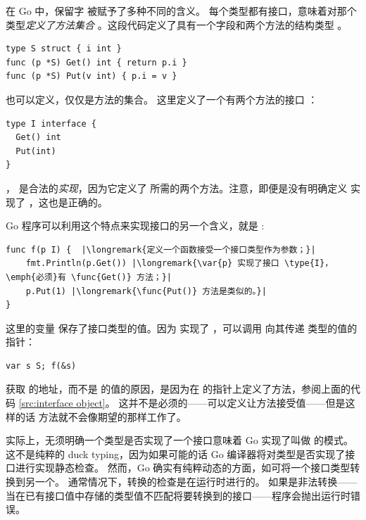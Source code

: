 \noindent{}
在 Go 中，保留字  被赋予了多种不同的含义。
每个类型都有接口，意味着对那个类型\emph{定义了方法集合}
。这段代码定义了具有一个字段和两个方法的结构类型 。
\begin{lstlisting}[caption=定义结构和结构的方法,label=src:interface object]
type S struct { i int }
func (p *S) Get() int { return p.i }
func (p *S) Put(v int) { p.i = v }
\end{lstlisting}
也可以定义，仅仅是方法的集合。
这里定义了一个有两个方法的接口 ：
\begin{lstlisting}
type I interface {
  Get() int
  Put(int)
}
\end{lstlisting}

 ， 是合法的\emph{实现}，因为它定义了 
所需的两个方法。注意，即便是没有明确定义  实现了 ，这也是正确的。

Go 程序可以利用这个特点来实现接口的另一个含义，就是
:

\begin{lstlisting}
func f(p I) {  |\longremark{定义一个函数接受一个接口类型作为参数；}|
    fmt.Println(p.Get()) |\longremark{\var{p} 实现了接口 \type{I}，\emph{必须}有 \func{Get()} 方法；}|
    p.Put(1) |\longremark{\func{Put()} 方法是类似的。}|
}
\end{lstlisting}
\showremarks
这里的变量  保存了接口类型的值。因为
 实现了 ，可以调用  向其传递  类型的值的指针：
\begin{lstlisting}
var s S; f(&s)
\end{lstlisting}

获取  的地址，而不是  的值的原因，是因为在  
的指针上定义了方法，参阅上面的代码 \ref{src:interface object}。
这并不是必须的——可以定义让方法接受值——但是这样的话  方法就不会像期望的那样工作了。

实际上，无须明确一个类型是否实现了一个接口意味着 Go 实现了叫做
\cite{duck_typing} 的模式。
这不是纯粹的 duck typing，因为如果可能的话 Go 编译器将对类型是否实现了接口进行实现静态检查。
然而，Go 确实有纯粹动态的方面，如可将一个接口类型转换到另一个。
通常情况下，转换的检查是在运行时进行的。
如果是非法转换——当在已有接口值中存储的类型值不匹配将要转换到的接口——程序会抛出运行时错误。

